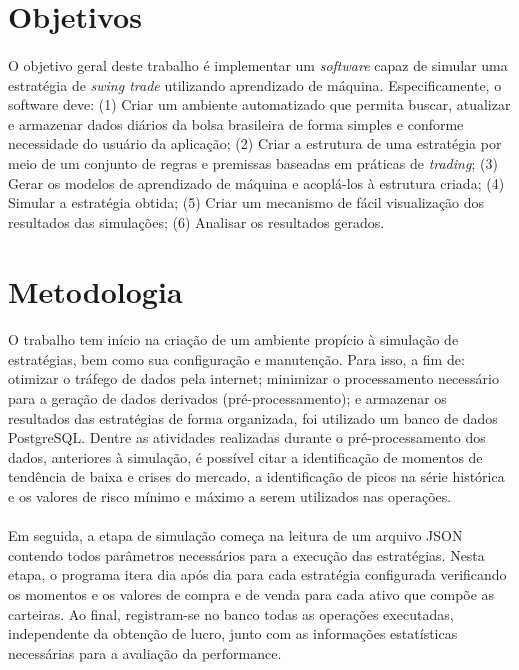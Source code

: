 \section{Objetivos}

\paragraph{} O objetivo geral deste trabalho é implementar um \textit{software} capaz de simular uma estratégia de \textit{swing trade} utilizando aprendizado de máquina. Especificamente, o software deve: (1) Criar um ambiente automatizado que permita buscar, atualizar e armazenar dados diários da bolsa brasileira de forma simples e conforme necessidade do usuário da aplicação; (2) Criar a estrutura de uma estratégia por meio de um conjunto de regras e premissas baseadas em práticas de \textit{trading}; (3) Gerar os modelos de aprendizado de máquina e acoplá-los à estrutura criada; (4) Simular a estratégia obtida; (5) Criar um mecanismo de fácil visualização dos resultados das simulações; (6) Analisar os resultados gerados.




\section{Metodologia}

\paragraph{} O trabalho tem início na criação de um ambiente propício à simulação de estratégias, bem como sua configuração e manutenção. Para isso, a fim de: otimizar o tráfego de dados pela internet; minimizar o processamento necessário para a geração de dados derivados (pré-processamento); e armazenar os resultados das estratégias de forma organizada, foi utilizado um banco de dados PostgreSQL. Dentre as atividades realizadas durante o pré-processamento dos dados, anteriores à simulação, é possível citar a identificação de momentos de tendência de baixa e crises do mercado, a identificação de picos na série histórica e os valores de risco mínimo e máximo a serem utilizados nas operações.

\paragraph{} Em seguida, a etapa de simulação começa na leitura de um arquivo JSON contendo todos parâmetros necessários para a execução das estratégias. Nesta etapa, o programa itera dia após dia para cada estratégia configurada verificando os momentos e os valores de compra e de venda para cada ativo que compõe as carteiras. Ao final, registram-se no banco todas as operações executadas, independente da obtenção de lucro, junto com as informações estatísticas necessárias para a avaliação da performance.


